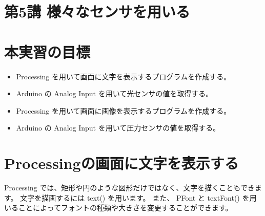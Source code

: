 \documentclass[11pt,a4paper]{jarticle}
\begin{document}
\section*{\LARGE{第5講 様々なセンサを用いる}}
\section{本実習の目標}
\begin{itemize}
 \item Processing を用いて画面に文字を表示するプログラムを作成する。
 \item Arduino の Analog Input を用いて光センサの値を取得する。
 \item Processing を用いて画面に画像を表示するプログラムを作成する。
 \item Arduino の Analog Input を用いて圧力センサの値を取得する。
\end{itemize}



\section{Processingの画面に文字を表示する}
Processing では、矩形や円のような図形だけではなく、文字を描くこともできます。
文字を描画するには text() を用います。
また、 PFont と textFont() を用いることによってフォントの種類や大きさを変更することができます。
\end{document}
